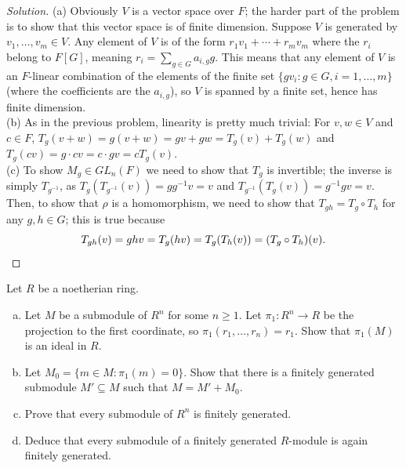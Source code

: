 \documentclass[10pt]{article}
\providecommand{\ii}{\item}
\providecommand{\inv}{^{-1}}
\newenvironment{soln}{\begin{proof}[Solution]}{\end{proof}}
\begin{document}
\begin{soln}
    (a) Obviously $V$ is a vector space over $F$;
    the harder part of the problem is to show that this vector space
    is of finite dimension. Suppose $V$ is generated by $v_1,\dots,v_m\in V$.
    Any element of $V$ is of the form $r_1v_1 + \cdots + r_mv_m$
    where the $r_i$ belong to $F[G]$, meaning $r_i = \sum_{g\in G} a_{i,g}g$.
    This means that any element of $V$ is an $F$-linear combination
    of the elements of the finite set $\{gv_i : g\in G, i=1,\dots,m\}$
    (where the coefficients are the $a_{i,g}$),
    so $V$ is spanned by a finite set, hence has finite dimension.
    \\

    (b) As in the previous problem, linearity is pretty much trivial:
    For $v,w\in V$ and $c\in F$,
    $T_g(v+w) = g(v+w) = gv + gw = T_g(v)+T_g(w)$
    and $T_g(cv) = g\cdot cv = c\cdot gv = cT_g(v)$.
    \\

    (c) To show $M_g\in GL_n(F)$ we need to show that $T_g$ is invertible;
    the inverse is simply $T_{g\inv}$, as
    $T_g(T_{g\inv}(v)) = gg\inv v = v$ and $T_{g\inv}(T_g(v)) = g\inv gv = v$.
    Then, to show that $\rho$ is a homomorphism, we need to show that
    $T_{gh} = T_g\circ T_h$ for any $g,h\in G$; this is true because
    \begin{equation*}
	T_{gh}(v) = ghv = T_g(hv) = T_g(T_h(v)) = (T_g\circ T_h)(v).\qedhere
    \end{equation*}
\end{soln}

\begin{problem}
    Let $R$ be a noetherian ring.
    \begin{enumerate}[(a)]
        \ii Let $M$ be a submodule of $R^n$ for some $n\ge 1$.
	Let $\pi_1\colon R^n\to R$ be the projection to the first coordinate,
	so $\pi_1(r_1,\dots,r_n) = r_1$. Show that $\pi_1(M)$
	is an ideal in $R$.
	\ii Let $M_0 = \{m\in M : \pi_1(m) = 0\}$.
	Show that there is a finitely generated submodule $M'\subseteq M$
	such that $M = M' + M_0$.
	\ii Prove that every submodule of $R^n$ is finitely generated.
	\ii Deduce that every submodule of a finitely generated $R$-module
	is again finitely generated.
    \end{enumerate}
\end{problem}
\end{document}
